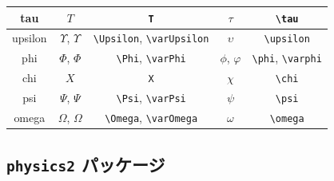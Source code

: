\documentclass[
    paper=a4paper,      %
    article,            %
    fontsize=11pt,      %
    jafontsize=11pt,    %
    head_space=25mm,    %
    foot_space=25mm,    %
    gutter=20mm,        %
    fore-edge=20mm      %
    ]{jlreq}            %
\begin{document}
\begin{table}[t]
\begin{tabular}{c|c|c|c|c}
        tau & $T$ & \verb|T| & $\tau$ & \verb|\tau| \\ \hline
        upsilon & $\Upsilon$, $\varUpsilon$ & \verb|\Upsilon|, \verb|\varUpsilon| & $\upsilon$ & \verb|\upsilon| \\ \hline
        phi & $\Phi$, $\varPhi$ & \verb|\Phi|, \verb|\varPhi| & $\phi$, $\varphi$ & \verb|\phi|, \verb|\varphi| \\ \hline
        chi & $X$ & \verb|X| & $\chi$ & \verb|\chi| \\ \hline
        psi & $\Psi$, $\varPsi$ & \verb|\Psi|, \verb|\varPsi| & $\psi$ & \verb|\psi| \\ \hline
        omega & $\Omega$, $\varOmega$ & \verb|\Omega|, \verb|\varOmega| & $\omega$ & \verb|\omega| \\ \hline
    \end{tabular}
\end{table}

\clearpage
\subsection{\texttt{physics2} パッケージ}
\label{ssec:physics2}
\end{document}
